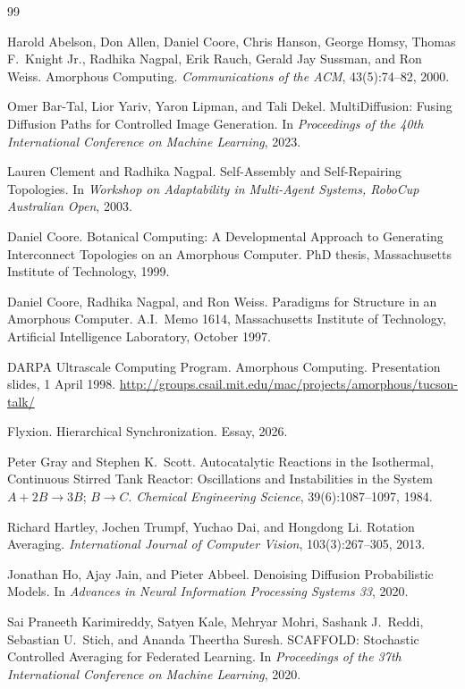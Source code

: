 \documentclass[11pt]{article}
\theoremstyle{definition}
\theoremstyle{plain}
\theoremstyle{remark}
\begin{document}
\begin{thebibliography}{99}

Harold Abelson, Don Allen, Daniel Coore, Chris Hanson, George Homsy, Thomas F.\ Knight Jr., Radhika Nagpal, Erik Rauch, Gerald Jay Sussman, and Ron Weiss.
Amorphous Computing.
\emph{Communications of the ACM}, 43(5):74--82, 2000.

Omer Bar-Tal, Lior Yariv, Yaron Lipman, and Tali Dekel.
MultiDiffusion: Fusing Diffusion Paths for Controlled Image Generation.
In \emph{Proceedings of the 40th International Conference on Machine Learning}, 2023.

Lauren Clement and Radhika Nagpal.
Self-Assembly and Self-Repairing Topologies.
In \emph{Workshop on Adaptability in Multi-Agent Systems, RoboCup Australian Open}, 2003.

Daniel Coore.
Botanical Computing: A Developmental Approach to Generating Interconnect Topologies on an Amorphous Computer.
PhD thesis, Massachusetts Institute of Technology, 1999.

Daniel Coore, Radhika Nagpal, and Ron Weiss.
Paradigms for Structure in an Amorphous Computer.
A.I.\ Memo 1614, Massachusetts Institute of Technology, Artificial Intelligence Laboratory, October 1997.

DARPA Ultrascale Computing Program.
Amorphous Computing.
Presentation slides, 1 April 1998.
\url{http://groups.csail.mit.edu/mac/projects/amorphous/tucson-talk/}

Flyxion.
Hierarchical Synchronization.
Essay, 2026.

Peter Gray and Stephen K.\ Scott.
Autocatalytic Reactions in the Isothermal, Continuous Stirred Tank Reactor: Oscillations and Instabilities in the System $A+2B\to 3B$; $B\to C$.
\emph{Chemical Engineering Science}, 39(6):1087--1097, 1984.

Richard Hartley, Jochen Trumpf, Yuchao Dai, and Hongdong Li.
Rotation Averaging.
\emph{International Journal of Computer Vision}, 103(3):267--305, 2013.

Jonathan Ho, Ajay Jain, and Pieter Abbeel.
Denoising Diffusion Probabilistic Models.
In \emph{Advances in Neural Information Processing Systems 33}, 2020.

Sai Praneeth Karimireddy, Satyen Kale, Mehryar Mohri, Sashank J.\ Reddi, Sebastian U.\ Stich, and Ananda Theertha Suresh.
SCAFFOLD: Stochastic Controlled Averaging for Federated Learning.
In \emph{Proceedings of the 37th International Conference on Machine Learning}, 2020.


\end{thebibliography}
\end{document}
